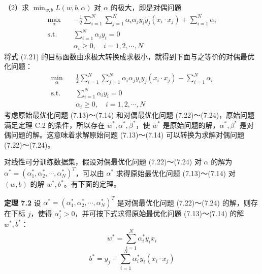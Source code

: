 \documentclass[UTF8,12pt,a4paper,fontset=fandol]{ctexart}
\begin{document}
（2）求 $\min_{w,b}L(w,b,\alpha)$ 对 $\alpha$ 的极大，即是对偶问题
\begin{equation}
\begin{aligned}
\max_\alpha\quad & -\frac{1}{2}\sum_{i=1}^N\sum_{j=1}^N\alpha_i\alpha_j y_i y_j(x_i\cdot x_j)+\sum_{i=1}^N\alpha_i\\
\mathrm{s.t.}\quad & \sum_{i=1}^N\alpha_i y_i=0\\
& \alpha_i\geq 0,\quad i=1,2,\cdots,N
\end{aligned}
\tag{7.21}
\end{equation}
将式 (7.21) 的目标函数由求极大转换成求极小，就得到下面与之等价的对偶最优化问题：
\begin{equation}
\begin{aligned}
\min_\alpha\quad & \frac{1}{2}\sum_{i=1}^N\sum_{j=1}^N\alpha_i\alpha_j y_i y_j(x_i\cdot x_j)-\sum_{i=1}^N\alpha_i\\
\mathrm{s.t.}\quad & \sum_{i=1}^N\alpha_i y_i=0\\
& \alpha_i\geq 0,\quad i=1,2,\cdots,N
\end{aligned}
\tag{7.22--7.24}
\end{equation}
考虑原始最优化问题 (7.13)～(7.14) 和对偶最优化问题 (7.22)～(7.24)，原始问题满足定理 C.2 的条件，所以存在 $w^*,\alpha^*,\beta^*$，使 $w^*$ 是原始问题的解，$\alpha^*,\beta^*$ 是对偶问题的解。这意味着求解原始问题 (7.13)～(7.14) 可以转换为求解对偶问题 (7.22)～(7.24)。

对线性可分训练数据集，假设对偶最优化问题 (7.22)～(7.24) 对 $\alpha$ 的解为 $\alpha^*=(\alpha_1^*,\alpha_2^*,\cdots,\alpha_N^*)^T$，可以由 $\alpha^*$ 求得原始最优化问题 (7.13)～(7.14) 对 $(w,b)$ 的解 $w^*,b^*$。有下面的定理。

\noindent\textbf{定理 7.2}\quad
设 $\alpha^*=(\alpha_1^*,\alpha_2^*,\cdots,\alpha_N^*)^T$ 是对偶最优化问题 (7.22)～(7.24) 的解，则存在下标 $j$，使得 $\alpha_j^*>0$，并可按下式求得原始最优化问题 (7.13)～(7.14) 的解 $w^*,b^*$：
\begin{equation}
w^*=\sum_{i=1}^N\alpha_i^* y_i x_i
\tag{7.25}
\end{equation}
\begin{equation}
b^*=y_j-\sum_{i=1}^N\alpha_i^* y_i(x_i\cdot x_j)
\tag{7.26}
\end{equation}
\end{document}
